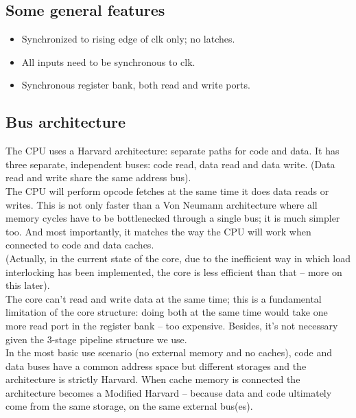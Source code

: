 \documentclass[11pt]{article}
\begin{document}
\subsection{Some general features}
\label{general_features}
    \begin{itemize}
    \item Synchronized to rising edge of clk only; no latches.
    \item All inputs need to be synchronous to clk.
    \item Synchronous register bank, both read and write ports.
    \end{itemize}

\subsection{Bus architecture}
\label{bus_architecture}
    The CPU uses a Harvard architecture: separate paths for code and data. It
    has three separate, independent buses: code read, data read and data write.
    (Data read and write share the same address bus).\\

    The CPU will perform opcode fetches at the same time it does data reads
    or writes. This is not only faster than a Von Neumann architecture where
    all memory cycles have to be bottlenecked through a single bus; it is much
    simpler too. And most importantly, it matches the way the CPU will work
    when connected to code and data caches.\\

    (Actually, in the current state of the core, due to the inefficient way in
    which load interlocking has been implemented, the core is less efficient
    than that -- more on this later).\\

    The core can't read and write data at the same time; this is a fundamental 
    limitation of the core structure: doing both at the same time would take 
    one more read port in the register bank -- too expensive. Besides, it's not
    necessary given the 3-stage pipeline structure we use.\\

    In the most basic use scenario (no external memory and no caches), code and
    data buses have a common address space but different storages and the
    architecture is strictly Harvard. When cache memory is connected
    the architecture becomes a Modified Harvard -- because data and 
    code ultimately come from the same storage, on the same external 
    bus(es).\\
\end{document}
